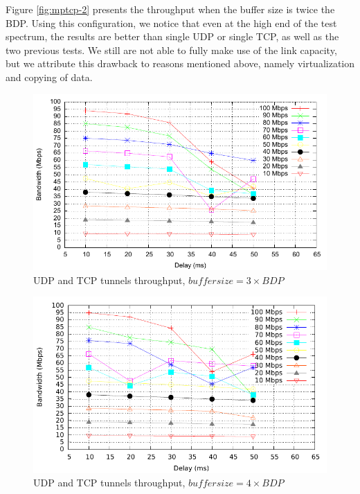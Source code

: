 Figure \ref{fig:mptcp-2} presents the throughput when the buffer size is twice
the BDP. Using this configuration, we notice that even at the high end of the
test spectrum, the results are better than single UDP or single TCP, as well
as the two previous tests. We still are not able to fully make use of the link
capacity, but we attribute this drawback to reasons mentioned above, namely
virtualization and copying of data.

\begin{figure}
  \centering
  \includegraphics[width=\textwidth]{img/test-mptcp-3}
  \caption{UDP and TCP tunnels throughput, $buffer size = 3 \times BDP$}
  \label{fig:mptcp-3}
\end{figure}

\begin{figure}
  \centering
  \includegraphics[width=\textwidth]{img/test-mptcp-4}
  \caption{UDP and TCP tunnels throughput, $buffer size = 4 \times BDP$}
  \label{fig:mptcp-4}
\end{figure}

